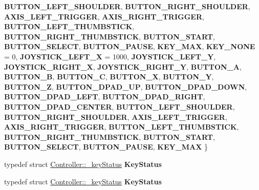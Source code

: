 \begin{DoxyCompactItemize}
{\bfseries B\+U\+T\+T\+O\+N\+\_\+\+L\+E\+F\+T\+\_\+\+S\+H\+O\+U\+L\+D\+ER}, 
{\bfseries B\+U\+T\+T\+O\+N\+\_\+\+R\+I\+G\+H\+T\+\_\+\+S\+H\+O\+U\+L\+D\+ER}, 
{\bfseries A\+X\+I\+S\+\_\+\+L\+E\+F\+T\+\_\+\+T\+R\+I\+G\+G\+ER}, 
{\bfseries A\+X\+I\+S\+\_\+\+R\+I\+G\+H\+T\+\_\+\+T\+R\+I\+G\+G\+ER}, 
\newline
{\bfseries B\+U\+T\+T\+O\+N\+\_\+\+L\+E\+F\+T\+\_\+\+T\+H\+U\+M\+B\+S\+T\+I\+CK}, 
{\bfseries B\+U\+T\+T\+O\+N\+\_\+\+R\+I\+G\+H\+T\+\_\+\+T\+H\+U\+M\+B\+S\+T\+I\+CK}, 
{\bfseries B\+U\+T\+T\+O\+N\+\_\+\+S\+T\+A\+RT}, 
{\bfseries B\+U\+T\+T\+O\+N\+\_\+\+S\+E\+L\+E\+CT}, 
\newline
{\bfseries B\+U\+T\+T\+O\+N\+\_\+\+P\+A\+U\+SE}, 
{\bfseries K\+E\+Y\+\_\+\+M\+AX}, 
{\bfseries K\+E\+Y\+\_\+\+N\+O\+NE} = 0, 
{\bfseries J\+O\+Y\+S\+T\+I\+C\+K\+\_\+\+L\+E\+F\+T\+\_\+X} = 1000, 
\newline
{\bfseries J\+O\+Y\+S\+T\+I\+C\+K\+\_\+\+L\+E\+F\+T\+\_\+Y}, 
{\bfseries J\+O\+Y\+S\+T\+I\+C\+K\+\_\+\+R\+I\+G\+H\+T\+\_\+X}, 
{\bfseries J\+O\+Y\+S\+T\+I\+C\+K\+\_\+\+R\+I\+G\+H\+T\+\_\+Y}, 
{\bfseries B\+U\+T\+T\+O\+N\+\_\+A}, 
\newline
{\bfseries B\+U\+T\+T\+O\+N\+\_\+B}, 
{\bfseries B\+U\+T\+T\+O\+N\+\_\+C}, 
{\bfseries B\+U\+T\+T\+O\+N\+\_\+X}, 
{\bfseries B\+U\+T\+T\+O\+N\+\_\+Y}, 
\newline
{\bfseries B\+U\+T\+T\+O\+N\+\_\+Z}, 
{\bfseries B\+U\+T\+T\+O\+N\+\_\+\+D\+P\+A\+D\+\_\+\+UP}, 
{\bfseries B\+U\+T\+T\+O\+N\+\_\+\+D\+P\+A\+D\+\_\+\+D\+O\+WN}, 
{\bfseries B\+U\+T\+T\+O\+N\+\_\+\+D\+P\+A\+D\+\_\+\+L\+E\+FT}, 
\newline
{\bfseries B\+U\+T\+T\+O\+N\+\_\+\+D\+P\+A\+D\+\_\+\+R\+I\+G\+HT}, 
{\bfseries B\+U\+T\+T\+O\+N\+\_\+\+D\+P\+A\+D\+\_\+\+C\+E\+N\+T\+ER}, 
{\bfseries B\+U\+T\+T\+O\+N\+\_\+\+L\+E\+F\+T\+\_\+\+S\+H\+O\+U\+L\+D\+ER}, 
{\bfseries B\+U\+T\+T\+O\+N\+\_\+\+R\+I\+G\+H\+T\+\_\+\+S\+H\+O\+U\+L\+D\+ER}, 
\newline
{\bfseries A\+X\+I\+S\+\_\+\+L\+E\+F\+T\+\_\+\+T\+R\+I\+G\+G\+ER}, 
{\bfseries A\+X\+I\+S\+\_\+\+R\+I\+G\+H\+T\+\_\+\+T\+R\+I\+G\+G\+ER}, 
{\bfseries B\+U\+T\+T\+O\+N\+\_\+\+L\+E\+F\+T\+\_\+\+T\+H\+U\+M\+B\+S\+T\+I\+CK}, 
{\bfseries B\+U\+T\+T\+O\+N\+\_\+\+R\+I\+G\+H\+T\+\_\+\+T\+H\+U\+M\+B\+S\+T\+I\+CK}, 
\newline
{\bfseries B\+U\+T\+T\+O\+N\+\_\+\+S\+T\+A\+RT}, 
{\bfseries B\+U\+T\+T\+O\+N\+\_\+\+S\+E\+L\+E\+CT}, 
{\bfseries B\+U\+T\+T\+O\+N\+\_\+\+P\+A\+U\+SE}, 
{\bfseries K\+E\+Y\+\_\+\+M\+AX}
 \}
\item 
\mbox{\label{classController_a4889fa4ff6dce440aaa85b94ea04134e}} 
typedef struct \hyperlink{structController_1_1__keyStatus}{Controller\+::\+\_\+key\+Status} {\bfseries Key\+Status}
\item 
\mbox{\label{classController_a4889fa4ff6dce440aaa85b94ea04134e}} 
typedef struct \hyperlink{structController_1_1__keyStatus}{Controller\+::\+\_\+key\+Status} {\bfseries Key\+Status}
\end{DoxyCompactItemize}
